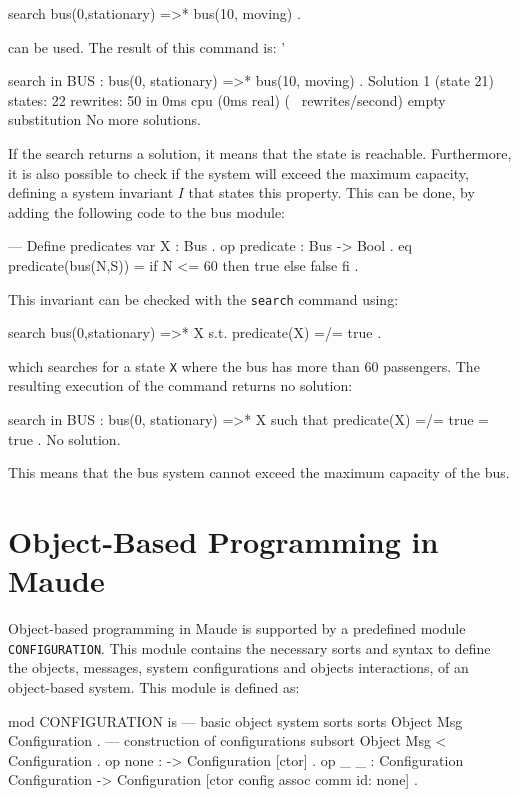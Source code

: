 \begin{example}
\begin{maude}
search bus(0,stationary) =>* bus(10, moving) .
\end{maude}
can be used. The result of this command is:
'\\
\begin{maude2}
search in BUS : bus(0, stationary) =>* bus(10, moving) .
Solution 1 (state 21)
states: 22  rewrites: 50 in 0ms cpu (0ms real) (~ rewrites/second)
empty substitution
No more solutions.
\end{maude2}
If the search returns a solution, it means that the state is reachable. Furthermore, it is also possible to check if the system will exceed the maximum capacity, defining a system invariant $I$ that states this property. This can be done, by adding the following code to the bus module:
\\
\begin{maude}
--- Define predicates
  var X : Bus .
  op predicate : Bus -> Bool .
  eq predicate(bus(N,S)) = if N <= 60 then true else false fi .
\end{maude}
This invariant can be checked with the \texttt{search} command using:
\\
\begin{maude2}
search bus(0,stationary) =>* X  s.t. predicate(X) =/= true .
\end{maude2}
which searches for a state \texttt{X} where the bus has more than 60 passengers. The resulting execution of the command returns no solution: \\
\begin{maude2}
search in BUS : bus(0, stationary) =>* 
                X such that predicate(X) =/= true = true .
No solution.
\end{maude2}
This means that the bus system cannot exceed the maximum capacity of the bus.


\end{example}


\section{Object-Based Programming in Maude}
Object-based programming in Maude \cite{MaudeManual, Lecture3, PeterMaude} is supported by a predefined module \texttt{CONFIGURATION}. This module contains the necessary sorts and syntax to define the objects, messages, system configurations and objects interactions, of an object-based system. This module is defined as:
\\
\begin{maude}
mod CONFIGURATION is
  --- basic object system sorts
  sorts Object Msg Configuration .
  --- construction of configurations
  subsort Object Msg < Configuration .
  op none : -> Configuration [ctor] .
  op _ _ : Configuration Configuration -> Configuration
           [ctor config assoc comm id: none] .
\end{maude}

